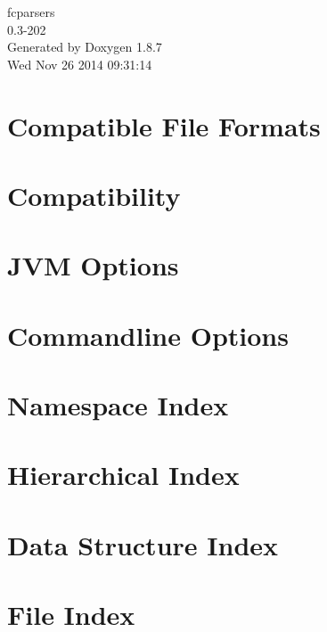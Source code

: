 \documentclass[twoside]{book}
\newcommand{\+}{\discretionary{\mbox{\scriptsize$\hookleftarrow$}}{}{}}
\newcommand{\clearemptydoublepage}{%
  \newpage{\pagestyle{empty}\cleardoublepage}%
}
\begin{document}
\begin{titlepage}
\vspace*{7cm}
\begin{center}%
{\Large fcparsers \\[1ex]\large 0.\+3-\/202 }\\
\vspace*{1cm}
{\large Generated by Doxygen 1.8.7}\\
\vspace*{0.5cm}
{\small Wed Nov 26 2014 09:31:14}\\
\end{center}
\end{titlepage}
\clearemptydoublepage
\tableofcontents
\clearemptydoublepage
{}

\chapter{Compatible File Formats}
\label{formats}

\chapter{Compatibility}
\label{Compatibility}

\chapter{J\+V\+M Options}
\label{jvmopt}

\chapter{Commandline Options}
\label{cmdopt}

\chapter{Namespace Index}

\chapter{Hierarchical Index}

\chapter{Data Structure Index}

\chapter{File Index}

\end{document}
